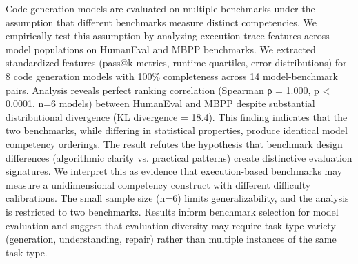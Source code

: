 
Code generation models are evaluated on multiple benchmarks under the assumption that different benchmarks measure distinct competencies. We empirically test this assumption by analyzing execution trace features across model populations on HumanEval and MBPP benchmarks. We extracted standardized features (pass@k metrics, runtime quartiles, error distributions) for 8 code generation models with 100\% completeness across 14 model-benchmark pairs. Analysis reveals perfect ranking correlation (Spearman ρ = 1.000, p < 0.0001, n=6 models) between HumanEval and MBPP despite substantial distributional divergence (KL divergence = 18.4). This finding indicates that the two benchmarks, while differing in statistical properties, produce identical model competency orderings. The result refutes the hypothesis that benchmark design differences (algorithmic clarity vs. practical patterns) create distinctive evaluation signatures. We interpret this as evidence that execution-based benchmarks may measure a unidimensional competency construct with different difficulty calibrations. The small sample size (n=6) limits generalizability, and the analysis is restricted to two benchmarks. Results inform benchmark selection for model evaluation and suggest that evaluation diversity may require task-type variety (generation, understanding, repair) rather than multiple instances of the same task type.
